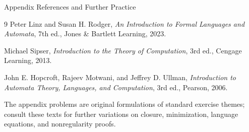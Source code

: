 \documentclass[10pt]{beamer}
\begin{document}
\begin{frame}{Appendix References and Further Practice}
  \footnotesize
  \begin{thebibliography}{9}
      Peter Linz and Susan H. Rodger,
      \newblock \emph{An Introduction to Formal Languages and Automata}, 7th ed.,
      \newblock Jones \& Bartlett Learning, 2023.

      Michael Sipser,
      \newblock \emph{Introduction to the Theory of Computation}, 3rd ed.,
      \newblock Cengage Learning, 2013.

      John E. Hopcroft, Rajeev Motwani, and Jeffrey D. Ullman,
      \newblock \emph{Introduction to Automata Theory, Languages, and
      Computation}, 3rd ed.,
      \newblock Pearson, 2006.
  \end{thebibliography}
  The appendix problems are original formulations of standard exercise
  themes; consult these texts for further variations on closure, minimization,
  language equations, and nonregularity proofs.
\end{frame}
\end{document}
